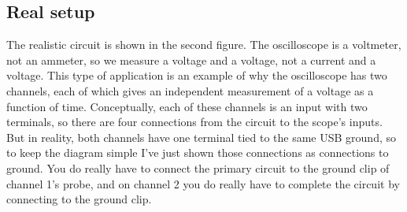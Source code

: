 \subsection*{Real setup}

The realistic circuit is shown in the second figure. The oscilloscope is
a voltmeter, not an ammeter, so we measure a voltage and a voltage, not
a current and a voltage. This type of application is an example of why the oscilloscope has two channels,
each of which gives an independent measurement of a voltage as a function of time.
Conceptually, each of these channels is an input with two terminals, so there are four
connections from the circuit to the scope's inputs. But in reality, both channels
have one terminal tied to the same USB ground, so to keep the diagram simple I've
just shown those connections as connections to ground. You do really have to connect
the primary circuit to the ground clip of channel 1's probe, and on channel 2 you
do really have to complete the circuit by connecting to the ground clip.



